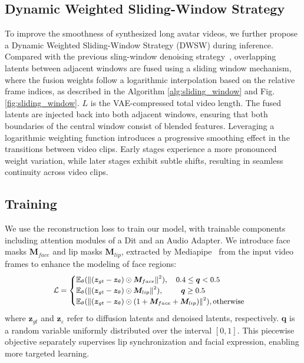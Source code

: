 \subsection{Dynamic Weighted Sliding-Window Strategy}
\label{sec: sliding_window}
To improve the smoothness of synthesized long avatar videos, we further propose a Dynamic Weighted Sliding-Window Strategy (DWSW) during inference.
Compared with the previous sling-window denoising strategy~\cite{ji2025sonic},  overlapping latents between adjacent windows are fused using a sliding window mechanism, where the fusion weights follow a logarithmic interpolation based on the relative frame indices, as described in the Algorithm \ref{alg:sliding_window} and Fig. \ref{fig:sliding_window}.
$L$ is the VAE-compressed total video length.
The fused latents are injected back into both adjacent windows, ensuring that both boundaries of the central window consist of blended features. Leveraging a logarithmic weighting function introduces a progressive smoothing effect in the transitions between video clips. Early stages experience a more pronounced weight variation, while later stages exhibit subtle shifts, resulting in seamless continuity across video clips.

\subsection{Training}
\label{sec: training}
We use the reconstruction loss to train our model, with trainable components including attention modules of a Dit and an Audio Adapter.
We introduce face masks $\bm{M}_{face}$ and lip masks $\bm{M}_{lip}$, extracted by Mediapipe~\cite{lugaresi2019mediapipe} from the input video frames to enhance the modeling of face regions:
\begin{equation}\small
\label{eq:loss}
\begin{aligned}
     \mathcal{L}=\begin{cases}
  \mathbb{E}_{\theta}(\left \| (\bm{z}_{gt}-\bm{z}_{\theta})\odot  \bm{M}_{face}  \right \|^{2}) ,~~~0.4\le\bm{q}<0.5& \\
  \mathbb{E}_{\theta}(\left \| (\bm{z}_{gt}-\bm{z}_{\theta})\odot  \bm{M}_{lip}  \right \|^{2}) ,~~~~~~~\bm{q}\ge0.5&  \\
  \mathbb{E}_{\theta}(\left \| (\bm{z}_{gt}-\bm{z}_{\theta})\odot  (1+\bm{M}_{face}+\bm{M}_{lip})  \right \|^{2}) , \text{otherwise}& 
\end{cases}
\end{aligned}
\end{equation}
where $\bm{z}_{gt}$ and $\bm{z}_{\varepsilon}$ refer to diffusion latents and denoised latents, respectively. $\bm{q}$ is a random variable uniformly distributed over the interval $[0, 1]$.
This piecewise objective separately supervises lip synchronization and facial expression, enabling more targeted learning.